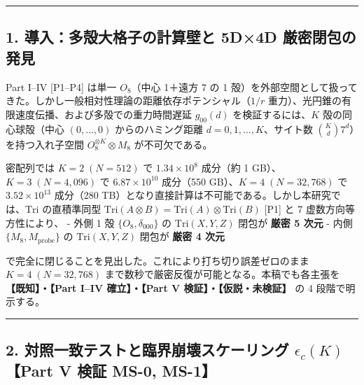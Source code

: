 \documentclass[
  a4paper,
]{ltjsarticle}
\begin{document}
\begin{center}\rule{0.5\linewidth}{0.5pt}\end{center}

\subsection{1. 導入：多殻大格子の計算壁と 5D×4D
厳密閉包の発見}\label{ux5c0eux5165ux591aux6bbbux5927ux683cux5b50ux306eux8a08ux7b97ux58c1ux3068-5d4d-ux53b3ux5bc6ux9589ux5305ux306eux767aux898b}

Part I--IV {[}P1--P4{]} は単一 \(O_8\)（中心 1＋遠方 7 の 1
殻）を外部空間として扱ってきた。しかし一般相対性理論の距離依存ポテンシャル（\(1/r\)
重力）、光円錐の有限速度伝播、および多殻での重力時間遅延 \(g_{00}(d)\)
を検証するには、\(K\) 殻の同心球殻（中心 \((0,\dots,0)\)
からのハミング距離 \(d = 0, 1, \dots, K\)、サイト数
\(\binom{K}{d} 7^d\)）を持つ入れ子空間 \(O_8^{\otimes K} \otimes M_8\)
が不可欠である。

密配列では \(K=2\;(N=512)\) で \(1.34\times 10^8\) 成分（約 1
GB）、\(K=3\;(N=4{,}096)\) で \(6.87\times 10^{10}\) 成分（550
GB）、\(K=4\;(N=32{,}768)\) で \(3.52\times 10^{13}\) 成分（280
TB）となり直接計算は不可能である。しかし本研究では、\(\mathrm{Tri}\)
の直積準同型
\(\mathrm{Tri}(A\otimes B)=\mathrm{Tri}(A)\otimes\mathrm{Tri}(B)\)
{[}P1{]} と 7 虚数方向等方性により、 - 外側 1 殻
\(\{O_8, \delta_{000}\}\) の \(\mathrm{Tri}(X,Y,Z)\) 閉包が \textbf{厳密
5 次元} - 内側 \(\{M_8, M_{\mathrm{probe}}\}\) の
\(\mathrm{Tri}(X,Y,Z)\) 閉包が \textbf{厳密 4 次元}

で完全に閉じることを見出した。これにより打ち切り誤差ゼロのまま
\(K = 4\;(N=32{,}768)\) まで数秒で厳密反復が可能となる。本稿でも各主張を
\textbf{【既知】・【Part I--IV 確立】・【Part V
検証】・【仮説・未検証】} の 4 段階で明示する。

\begin{center}\rule{0.5\linewidth}{0.5pt}\end{center}

\subsection{\texorpdfstring{2. 対照一致テストと臨界崩壊スケーリング
\(\epsilon_c(K)\)【Part V 検証 MS-0,
MS-1】}{2. 対照一致テストと臨界崩壊スケーリング \textbackslash epsilon\_c(K)【Part V 検証 MS-0, MS-1】}}\label{ux5bfeux7167ux4e00ux81f4ux30c6ux30b9ux30c8ux3068ux81e8ux754cux5d29ux58caux30b9ux30b1ux30fcux30eaux30f3ux30b0-epsilon_ckpart-v-ux691cux8a3c-ms-0-ms-1}
\end{document}
